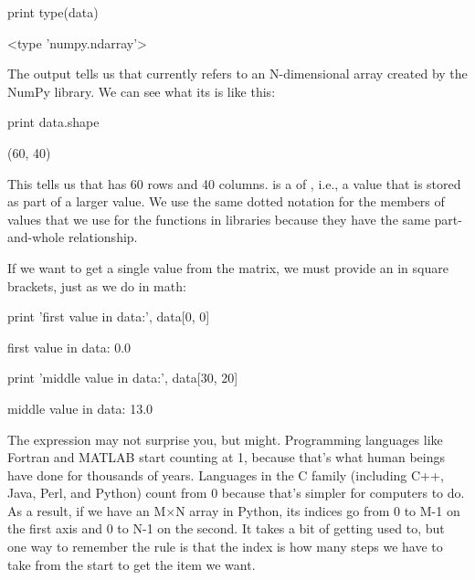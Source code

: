 \begin{VerbIn}
print type(data)
\end{VerbIn}

\begin{VerbOut}
<type 'numpy.ndarray'>
\end{VerbOut}

The output tells us that  currently refers to an
N-dimensional array created by the NumPy library. We can see what its
 is like this:

\begin{VerbIn}
print data.shape
\end{VerbIn}

\begin{VerbOut}
(60, 40)
\end{VerbOut}

This tells us that  has 60 rows and 40 columns.
 is a  of ,
i.e., a value that is stored as part of a larger value. We use the same
dotted notation for the members of values that we use for the functions
in libraries because they have the same part-and-whole relationship.

If we want to get a single value from the matrix, we must provide an
 in square brackets, just as we do in math:

\begin{VerbIn}
print 'first value in data:', data[0, 0]
\end{VerbIn}

\begin{VerbOut}
first value in data: 0.0
\end{VerbOut}

\begin{VerbIn}
print 'middle value in data:', data[30, 20]
\end{VerbIn}

\begin{VerbOut}
middle value in data: 13.0
\end{VerbOut}

The expression  may not surprise you, but
 might. Programming languages like Fortran and
MATLAB start counting at 1, because that's what human beings have done
for thousands of years. Languages in the C family (including C++, Java,
Perl, and Python) count from 0 because that's simpler for computers to
do. As a result, if we have an M${\times}$N array in Python, its indices go from
0 to M-1 on the first axis and 0 to N-1 on the second. It takes a bit of
getting used to, but one way to remember the rule is that the index is
how many steps we have to take from the start to get the item we want.

